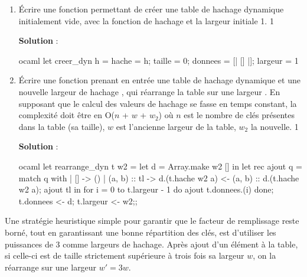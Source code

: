 \documentclass[10pt,a4paper, varwidth]{article}
\def\cor{1}
\begin{document}
	\begin{enumerate}
		\item Écrire une fonction  permettant de créer une table de hachage dynamique initialement vide, 
        avec la fonction de hachage  et la largeur initiale 1.
		\if\cor1
        \begin{emphase}
            \textbf{Solution} : 
            \begin{center}
\begin{code}{ocaml}
let creer_dyn h =
    {hache = h; taille = 0; donnees = [| [] |]; largeur = 1}
\end{code}
            \end{center}
        \end{emphase}
        \fi 
		\item Écrire une fonction  prenant en entrée une table de hachage dynamique  et une
		nouvelle largeur de hachage , qui réarrange la table sur une largeur . En supposant que le calcul des valeurs
		de hachage se fasse en temps constant, la complexité doit être en O($n$ + $w$ + $w_2$) où $n$ est le nombre de clés
		présentes dans la table (sa taille), $w$ est l'ancienne largeur de la table, $w_2$ la nouvelle.
        \if\cor1
        \begin{emphase}
            \textbf{Solution} : 
            \begin{center}
\begin{code}{ocaml}
let rearrange_dyn t w2 =
    let d = Array.make w2 [] in
    let rec ajout q = match q with
        | [] -> ()
        | (a, b) :: tl -> d.(t.hache w2 a) <- (a, b) :: d.(t.hache w2 a);
                          ajout tl in
    for i = 0 to t.largeur - 1 do
        ajout t.donnees.(i)
    done;
    t.donnees <- d;
    t.largeur <- w2;;    
\end{code}
            \end{center}
        \end{emphase}
        \fi
	\end{enumerate}
	Une stratégie heuristique simple pour garantir que le facteur de remplissage reste borné, tout en garantissant
	une bonne répartition des clés, est
	d'utiliser les puissances de 3 comme largeurs de hachage. Après ajout d'un élément à la table, si celle-ci est de
	taille strictement supérieure à trois fois sa largeur $w$, on la réarrange sur une largeur $w′ = 3w$.
\end{document}
